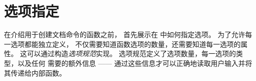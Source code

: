 \documentclass{l3doc}
\begin{document}
%
\section{选项指定}

%
在介绍用于创建文档命令的函数之前，
首先展示在  中如何指定选项。
为了允许每一选项都能独立定义，
 不仅需要知道函数选项的数量，还需要知道每一选项的属性。
这可以通过构造\emph{选项规范}实现。
选项规范定义了选项数量，每一选项的类型，以及任何  需要的额外信息
—— 通过这些信息才可以正确地读取用户输入并将其传递给内部函数。
\end{document}
